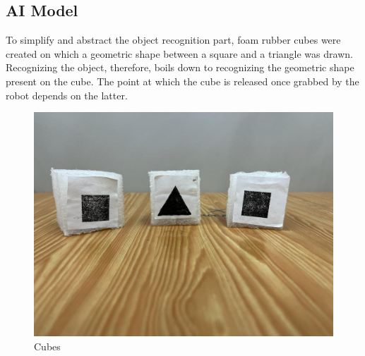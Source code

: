 \documentclass[a4paper,11pt]{report}
\theoremstyle{definition}
\theoremstyle{plain}
\begin{document}
        \subsection{AI Model}
            To simplify and abstract the object recognition part, foam rubber cubes were created on which a geometric shape between a square and a triangle was drawn. Recognizing the object, therefore, boils down to recognizing the geometric shape present on the cube. The point at which the cube is released once grabbed by the robot depends on the latter. \newline
            \begin{figure}[H] %
                \includegraphics[scale=0.15]{images/cubi.jpeg}
                \centering
                \caption{Cubes}
            \end{figure}
\end{document}
